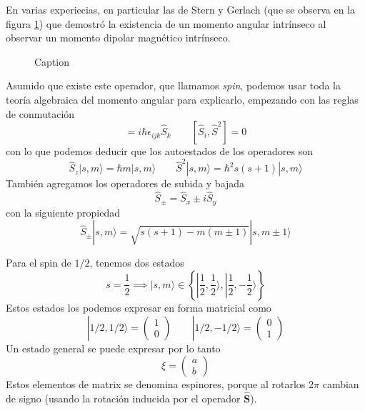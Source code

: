En varias experiecias, en particular las de Stern y Gerlach (que se observa en la figura \ref{fig:stern_gerlach}) que demostró la existencia de un momento angular intrínseco al observar un momento dipolar magnético intrínseco.

\begin{figure}[H]
    \centering
    \caption{Caption}
    \label{fig:stern_gerlach}
\end{figure}

Asumido que existe este operador, que llamamos \emph{spin}, podemos usar toda la teoría algebraica del momento angular para explicarlo, empezando con las reglas de conmutación
\begin{equation}
        [\hat{S}_i, \hat{S}_j] = i \hbar \epsilon_{ijk} \hat{S}_k \qquad [\hat{S}_i, \hat{S}^2] = 0
\end{equation}
con lo que podemos deducir que los autoestados de los operadores  son
\begin{equation}
\hat{S}_z |s,m\rangle = \hbar m |s,m\rangle \qquad \hat{S}^2 |s, m\rangle = \hbar^2 s(s + 1) |s,m\rangle
\end{equation}
También agregamos los operadores de subida y bajada
\begin{equation}
 \hat{S}_\pm = \hat{S}_x \pm i \hat{S}_y
\end{equation}
con la siguiente propiedad
\begin{equation}
\hat{S}_\pm |s, m\rangle = \sqrt{s(s+1) - m( m \pm 1)} |s, m \pm 1 \rangle 
\end{equation}

Para el spin de $1/2$, tenemos dos estados
\begin{equation}
    s = \frac{1}{2} \implies |s,m\rangle \in \left\{\left|\frac{1}{2},\frac{1}{2}\right.\rangle, \left|\frac{1}{2},-\frac{1}{2}\right.\rangle\right\}
\end{equation}
Estos estados los podemos expresar en forma matricial como
\begin{equation}
|1/2,1/2\rangle = \begin{pmatrix} 1 \\ 0 \end{pmatrix} \qquad |1/2,-1/2\rangle = \begin{pmatrix} 0 \\ 1 \end{pmatrix}
\end{equation}
Un estado general se puede expresar por lo tanto
\begin{equation}
    \xi = \begin{pmatrix} a \\ b \end{pmatrix}
\end{equation}
Estos elementos de matrix se denomina espinores, porque al rotarlos $2\pi$ cambian de signo (usando la rotación inducida por el operador $\hat{\boldsymbol{S}}$).

